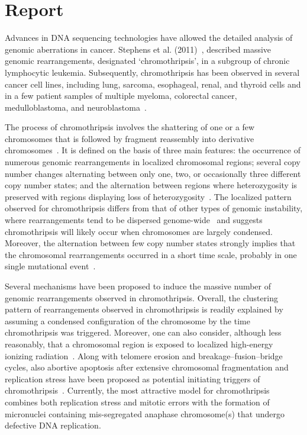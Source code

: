 \section*{Report}
Advances in DNA sequencing technologies have allowed the detailed analysis of genomic aberrations in cancer. Stephens et al. (2011)~\cite{stephens2011massive}, described massive genomic rearrangements, designated ‘chromothripsis’, in a subgroup of chronic lymphocytic leukemia. Subsequently, chromothripsis has been observed in several cancer cell lines, including lung, sarcoma, esophageal, renal, and thyroid cells and in a few patient samples of multiple myeloma, colorectal cancer, medulloblastoma, and neuroblastoma~\cite{magrangeas2011chromothripsis,kloosterman2011chromothripsis,rausch2012genome,molenaar2012sequencing}.

The process of chromothripsis involves the shattering of one or a few chromosomes that is followed by fragment reassembly into derivative chromosomes~\cite{maher2012chromothripsis}. It is defined on the basis of three main features: the occurrence of numerous genomic rearrangements in localized chromosomal
regions; several copy number changes alternating between only one, two, or occasionally three different copy number states; and the alternation between
regions where heterozygosity is preserved with regions displaying loss of heterozygosity~\cite{maher2012chromothripsis}. The localized pattern observed for
chromothripsis differs from that of other types of genomic instability, where rearrangements tend to be dispersed genome-wide~\cite{campbell2008identification,stephens2009complex} and suggests chromothripsis will likely occur when chromosomes are largely condensed. Moreover, the alternation between few copy
number states strongly implies that the chromosomal rearrangements occurred in a short time scale, probably in one single mutational event~\cite{stephens2011massive, righolt2012shattered}.

Several mechanisms have been proposed to induce the massive number of genomic rearrangements observed in chromothripsis. Overall, the clustering
pattern of rearrangements observed in chromothripsis is readily explained by assuming a condensed configuration of the chromosome by the time
chromothripsis was triggered. Moreover, one can also consider, although less reasonably, that a chromosomal region is exposed to localized high-energy
ionizing radiation~\cite{misteli2007beyond}. Along with telomere erosion and breakage–fusion–bridge cycles, also abortive apoptosis after extensive chromosomal
fragmentation and replication stress have been proposed as potential initiating triggers of chromothripsis~\cite{jones2012chromothripsis}.
Currently, the most attractive model for chromothripsis combines both replication stress and mitotic errors with the formation of micronuclei containing
mis-segregated anaphase chromosome(s) that undergo defective DNA replication.

